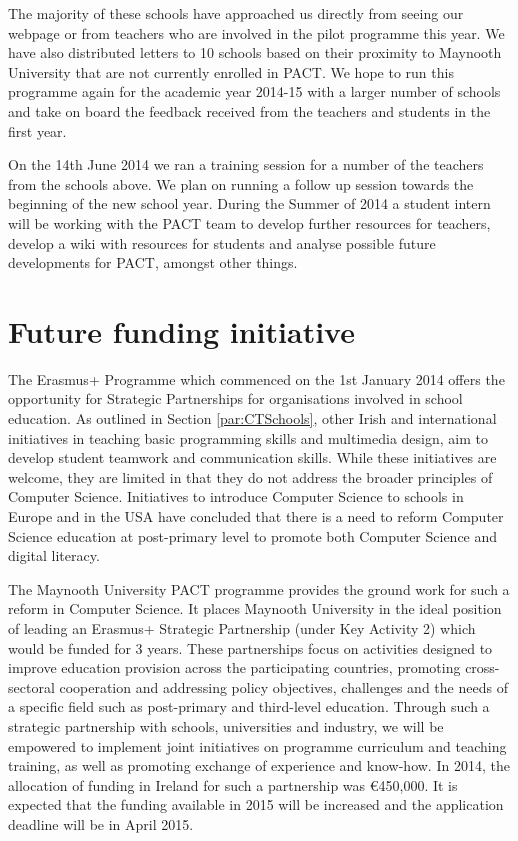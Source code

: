 \documentclass[a4paper]{article}
\begin{document}
The majority of these schools have approached us directly from seeing our webpage or from teachers who are involved in the pilot programme this year. We have also distributed letters to 10 schools based on their proximity to Maynooth University that are not currently enrolled in PACT. We hope to run this programme again for the academic year 2014-15 with a larger number of schools and take on board the feedback received from the teachers and students in the first year.

On the 14th June 2014 we ran a training session for a number of the teachers from the schools above. We plan on running a follow up session towards the beginning of the new school year. During the Summer of 2014 a student intern will be working with the PACT team to develop further resources for teachers, develop a wiki with resources for students and analyse possible future developments for PACT, amongst other things.


\section{Future funding initiative} \label{Sect:FutFunding}
The Erasmus+ Programme which commenced on the 1st January 2014 offers the opportunity for Strategic Partnerships for organisations involved in school education. As outlined in Section \ref{par:CTSchools}, other Irish and international initiatives in teaching basic programming skills and multimedia design, aim to develop student teamwork and communication skills. While these initiatives are welcome, they are limited in that they do not address the broader principles of Computer Science. Initiatives to introduce Computer Science to schools in Europe and in the USA have concluded that there is a need to reform Computer Science education at post-primary level to promote  both Computer Science and digital literacy. 

The Maynooth University PACT programme provides the ground work for such a reform in Computer Science. It places Maynooth University in the ideal position of leading an Erasmus+ Strategic Partnership (under Key Activity 2) which would be funded for 3 years. These partnerships focus on activities designed to improve education provision across the participating countries, promoting cross-sectoral cooperation and addressing policy objectives, challenges and the needs of a specific field such as post-primary and third-level education.  Through such a strategic partnership with schools, universities and industry, we will be empowered to implement joint initiatives on programme curriculum and teaching training, as well as promoting exchange of experience and know-how. In 2014, the allocation of funding in Ireland for such a partnership was \euro 450,000. It is expected that the funding available in 2015 will be increased and the application deadline will be in April 2015.  
\end{document}
